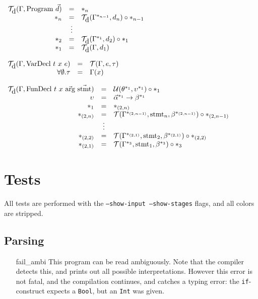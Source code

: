 \documentclass[14pt]{amsart}
\begin{document}
	
$\begin{array}{rcl}
	\mathcal{T}_{\mbox{d}}(\Gamma, \mbox{Program}~\vec{d}) & = & \ast_n \\
	{\ast_{n}} & = & \mathcal{T}_{\mbox{d}}(\Gamma^{{\ast_{n-1}}}, d_n) \circ {\ast_{n-1}} \\
	& \vdots & \\
	{\ast_{2}} & = & \mathcal{T}_{\mbox{d}}(\Gamma^{{\ast_{1}}}, d_2) \circ {\ast_{1}} \\
	{\ast_{1}} & = & \mathcal{T}_{\mbox{d}}(\Gamma, d_1) \\
\end{array}$

$\begin{array}{rcl}
	\mathcal{T}_{\mbox{d}}(\Gamma, \mbox{VarDecl}~t~x~e) & = & \mathcal{T}(\Gamma, e, \tau) \\
	\forall \emptyset . \tau	& = & \Gamma(x) \\
\end{array}$

$\begin{array}{rcl}
	\T_{\mbox{d}}(\Gamma, \mbox{FunDecl}~t~x~\vec{\mbox{arg}}~\vec{\mbox{stmt}}) & = & \U(\theta^\sn{1}, \upsilon^\sn{1}) \circ \sn{1} \\
	\upsilon	& = & \vec{\alpha}^\sn{1} \rightarrow \beta^\sn{1} \\
	\sn{1}		& = & \sn{(2,n)} \\
	\sn{(2,n)}	& = & \T(\Gamma^\sn{(2,n-1)}, \mbox{stmt}_n, \beta^\sn{(2,n-1)}) \circ \sn{(2,n-1)} \\
	& \vdots & \\
	\sn{(2,2)}	& = & \T(\Gamma^\sn{(2,1)}, \mbox{stmt}_2, \beta^\sn{(2,1)}) \circ \sn{(2,2)} \\
	\sn{(2,1)}	& = & \T(\Gamma^\sn{3}, \mbox{stmt}_1, \beta^\sn{3}) \circ \sn{3} \\
	
	
\end{array}$



\section{Tests}
All tests are performed with the \texttt{--show-input --show-stages} flags, and all colors are stripped.
\subsection{Parsing}
\begin{itemize}
	\item[fail\_ambi] This program can be read ambiguously. Note that the compiler detects this, and prints out all possible interpretations. However this error is not fatal, and the compilation continues, and catches a typing error: the \texttt{if}-construct expects a \texttt{Bool}, but an \texttt{Int} was given.
\end{itemize}
\end{document}
